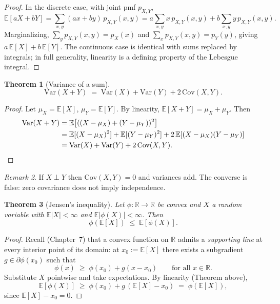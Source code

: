 \documentclass[11pt]{article}
\newtheorem{theorem}{Theorem}[section]
\theoremstyle{remark}
\newtheorem{remark}[theorem]{Remark}
\begin{document}
\begin{proof}
In the discrete case, with joint pmf $p_{X,Y}$,
\[
\mathbb{E}[aX+bY] = \sum_{x,y}(ax+by)\,p_{X,Y}(x,y) = a\sum_{x,y} x\,p_{X,Y}(x,y) + b\sum_{x,y} y\,p_{X,Y}(x,y).
\]
Marginalizing, $\sum_y p_{X,Y}(x,y) = p_X(x)$ and $\sum_x p_{X,Y}(x,y) = p_Y(y)$, giving $a\,\mathbb{E}[X] + b\,\mathbb{E}[Y]$. The continuous case is identical with sums replaced by integrals; in full generality, linearity is a defining property of the Lebesgue integral.
\end{proof}

\begin{theorem}[Variance of a sum]
\[
\mathrm{Var}(X+Y) \;=\; \mathrm{Var}(X) + \mathrm{Var}(Y) + 2\,\mathrm{Cov}(X,Y).
\]
\end{theorem}

\begin{proof}
Let $\mu_X = \mathbb{E}[X]$, $\mu_Y = \mathbb{E}[Y]$. By linearity, $\mathbb{E}[X+Y] = \mu_X + \mu_Y$. Then
\begin{align*}
\mathrm{Var}(X+Y) &= \mathbb{E}\!\left[((X-\mu_X)+(Y-\mu_Y))^2\right] \\
&= \mathbb{E}[(X-\mu_X)^2] + \mathbb{E}[(Y-\mu_Y)^2] + 2\,\mathbb{E}[(X-\mu_X)(Y-\mu_Y)] \\
&= \mathrm{Var}(X) + \mathrm{Var}(Y) + 2\,\mathrm{Cov}(X,Y). \qedhere
\end{align*}
\end{proof}

\begin{remark}
If $X\perp Y$ then $\mathrm{Cov}(X,Y)=0$ and variances add. The converse is false: zero covariance does not imply independence.
\end{remark}

\begin{theorem}[Jensen's inequality]
Let $\phi:\mathbb{R}\to\mathbb{R}$ be convex and $X$ a random variable with $\mathbb{E}|X|<\infty$ and $\mathbb{E}|\phi(X)|<\infty$. Then
\[
\phi(\mathbb{E}[X]) \;\le\; \mathbb{E}[\phi(X)].
\]
\end{theorem}

\begin{proof}
Recall (Chapter~7) that a convex function on $\mathbb{R}$ admits a \emph{supporting line} at every interior point of its domain: at $x_0 := \mathbb{E}[X]$ there exists a subgradient $g \in \partial\phi(x_0)$ such that
\[
\phi(x) \;\ge\; \phi(x_0) + g(x - x_0) \qquad \text{for all } x \in \mathbb{R}.
\]
Substitute $X$ pointwise and take expectations. By linearity (Theorem above),
\[
\mathbb{E}[\phi(X)] \;\ge\; \phi(x_0) + g\,(\mathbb{E}[X] - x_0) \;=\; \phi(\mathbb{E}[X]),
\]
since $\mathbb{E}[X] - x_0 = 0$.
\end{proof}
\end{document}
